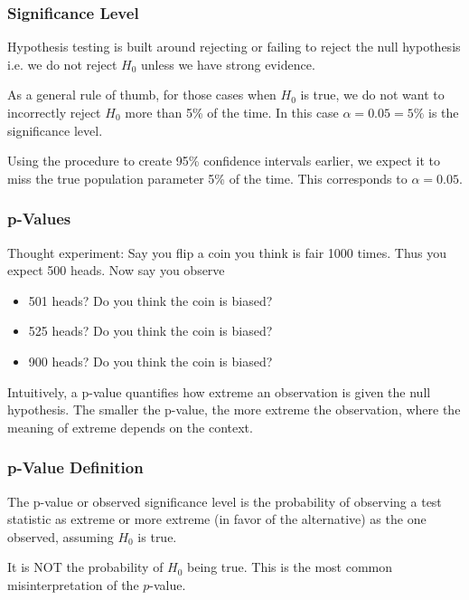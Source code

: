 \documentclass[handout]{beamer}
\newcommand{\blue}[1]{\textcolor{blue2}{#1}}
\begin{document}
\begin{frame}
\frametitle{Significance Level}
Hypothesis testing is built around rejecting or failing to reject the null hypothesis\\
i.e. we do not reject $H_0$ unless we have \blue{strong evidence}.

\pause \vspace{0.5cm}

As a general rule of thumb, for those cases when $H_0$ is true, we do not want to incorrectly reject $H_0$ more than 5\% of the time.  In this case $\alpha = 0.05 = 5\%$ is the \blue{significance level}.  

\pause \vspace{0.5cm}

Using the procedure to create 95\% confidence intervals earlier, we expect it to miss the true population parameter 5\% of the time.  This corresponds to $\alpha=0.05$.   
\end{frame}


\begin{frame}
\frametitle{p-Values}
Thought experiment:  Say you flip a coin you think is fair 1000 times.  Thus you expect 500 heads.   Now say you observe
\begin{itemize}
\pause \item 501 heads? Do you think the coin is biased?
\pause \item 525 heads? Do you think the coin is biased?
\pause \item 900 heads? Do you think the coin is biased?
\end{itemize}
\pause Intuitively, a \blue{p-value} quantifies how \blue{extreme} an observation is given the null hypothesis.  
\vskip 0.25cm
\pause The smaller the p-value, the more \blue{extreme} the observation, where the meaning of extreme depends on the context.  
\end{frame}


\begin{frame}
\frametitle{p-Value Definition}
The \blue{p-value} or \blue{observed significance level} is the probability of observing a test statistic as extreme or more extreme (in favor of the alternative) as the one observed, assuming $H_0$ is true.

\vspace{0.5cm}

\pause It is \blue{NOT} the probability of $H_0$ being true.  This is the most common misinterpretation of the $p$-value.

\end{frame}
\end{document}
